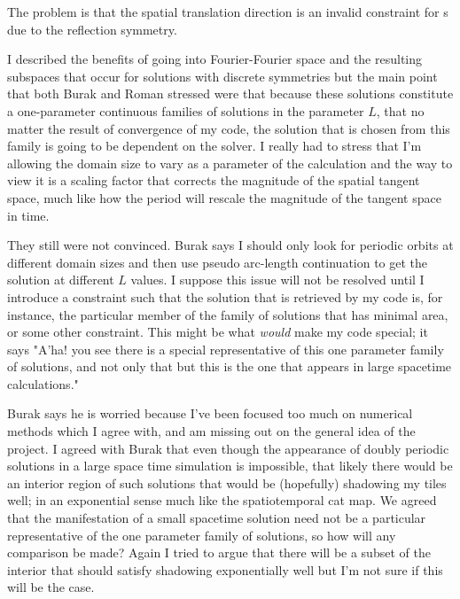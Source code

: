 \begin{description}
{The problem is that the spatial translation direction is an invalid constraint for \ppo s
due to the reflection symmetry.

I described the benefits of going into Fourier-Fourier space and the
resulting subspaces that occur for solutions with discrete symmetries but the
main point that both Burak and Roman stressed were that because these
solutions constitute a one-parameter continuous families of solutions in the
parameter $L$, that no matter the result of convergence of my code, the
solution that is chosen from this family is going to be dependent on the
solver. I really had to stress that I'm allowing the domain size to vary as a
parameter of the calculation and the way to view it is a scaling factor that
corrects the magnitude of the spatial tangent space, much like how the period
will rescale the magnitude of the tangent space in time.

They still were not convinced. Burak says I should only look for periodic
orbits at different domain sizes and then use pseudo arc-length continuation
to get the solution at different $L$ values. I suppose this issue will not be
resolved until I introduce a constraint such that the solution that is
retrieved by my code is, for instance, the particular member of the family of
solutions that has minimal area, or some other constraint. This might be what
\emph{would} make my code special; it says "A'ha! you see there is a special
representative of this one parameter family of solutions, and not only that
but this is the one that appears in large spacetime calculations."

Burak says he is worried because I've been focused too much on numerical
methods which I agree with, and am missing out on the general idea of the
project.
I agreed with Burak that even though the appearance of doubly
periodic solutions in a large space time simulation is impossible, that
likely there would be an interior region of such solutions that would be
(hopefully) shadowing my tiles well; in an exponential sense much like the
spatiotemporal cat map. We agreed that the manifestation of a small spacetime
solution need not be a particular representative of the one parameter family
of solutions, so how will any comparison be made? Again I tried to argue that
there will be a subset of the interior that should satisfy shadowing
exponentially well but I'm not sure if this will be the case.

}
\end{description}
